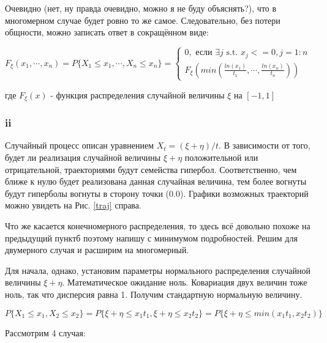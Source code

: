 \documentclass[a4paper,12pt]{article}
\begin{document}
\begin{enumerate}[\Sun]
	Очевидно (нет, ну правда очевидно, можно я не буду объяснять?), что в многомерном случае будет ровно то же самое. Следовательно, без потери общности, можно записать ответ в сокращённом виде:
	
	$ F_\xi(x_1, \cdots, x_n) = P\{X_1 \le x_1,\cdots, X_n \le x_n\} = 
	\begin{cases}
		0, \text{ если }  \exists j \text{ s.t. } x_j <= 0, j = 1:n \\
		F_\xi\left(min\left(\frac{ln(x_1)}{t_1},  \cdots, \frac{ln(x_n)}{t_n}\right) \right)
	\end{cases} $
	
	где $ F_\xi(x) $ - функция распределения случайной величины $ \xi $ на $ [-1, 1] $
	 
\end{enumerate}

\subsubsection{ii}
Случайный процесс описан уравнением $X_{t}=(\xi+\eta) / t$. В зависимости от того, будет ли реализация случайной величины $ \xi + \eta $ положительной или отрицательной, траекториями будут семейства гипербол. Соответственно, чем ближе к нулю будет реализована данная случайная величина, тем более вогнуты будут гиперболы вогнуты в сторону точки (0.0). Графики возможных траекторий можно увидеть на Рис. \ref{traj} справа.


Что же касается конечномерного распределения, то здесь всё довольно похоже на предыдущий пунктб поэтому напишу с минимумом подробностей. Решим для двумерного случая и расширим на многомерный.

 Для начала, однако, установим параметры нормального распределения случайной величины $ \xi + \eta $. Математическое ожидание ноль. Ковариация двух величин тоже ноль, так что дисперсия равна 1. Получим стандартную нормальную величину.

\[  P\{X_1 \le x_1, X_2 \le x_2\} = P\{ \xi + \eta \le x_1 t_1, \xi + \eta \le x_2 t_2 \} = P\{ \xi + \eta \le min(x_1 t_1, x_2 t_2) \} \]

Рассмотрим 4 случая:
\end{document}
